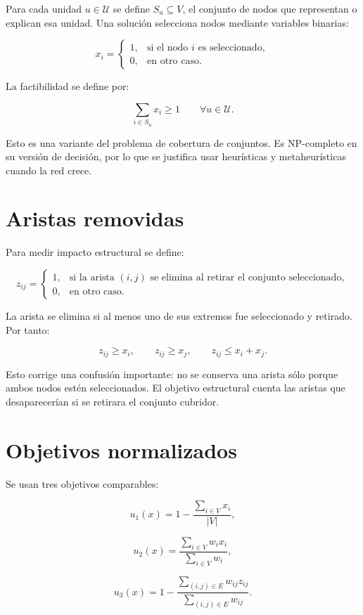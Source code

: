 \documentclass[11pt]{article}
\begin{document}
Para cada unidad $u\in \mathcal{U}$ se define $S_u\subseteq V$, el conjunto de nodos que representan o explican esa unidad. Una solución selecciona nodos mediante variables binarias:

\[
x_i =
\begin{cases}
1, & \text{si el nodo } i \text{ es seleccionado},\\
0, & \text{en otro caso}.
\end{cases}
\]

La factibilidad se define por:

\[
\sum_{i\in S_u} x_i \geq 1 \qquad \forall u\in \mathcal{U}.
\]

Esto es una variante del problema de cobertura de conjuntos. Es NP-completo en su versión de decisión, por lo que se justifica usar heurísticas y metaheurísticas cuando la red crece.

\section{Aristas removidas}

Para medir impacto estructural se define:

\[
z_{ij} =
\begin{cases}
1, & \text{si la arista } (i,j) \text{ se elimina al retirar el conjunto seleccionado},\\
0, & \text{en otro caso}.
\end{cases}
\]

La arista se elimina si al menos uno de sus extremos fue seleccionado y retirado. Por tanto:

\[
z_{ij} \geq x_i,\qquad z_{ij}\geq x_j,\qquad z_{ij}\leq x_i+x_j.
\]

Esto corrige una confusión importante: no se conserva una arista sólo porque ambos nodos estén seleccionados. El objetivo estructural cuenta las aristas que desaparecerían si se retirara el conjunto cubridor.

\section{Objetivos normalizados}

Se usan tres objetivos comparables:

\[
u_1(x)=1-\frac{\sum_{i\in V}x_i}{|V|},
\]

\[
u_2(x)=\frac{\sum_{i\in V} w_i x_i}{\sum_{i\in V} w_i},
\]

\[
u_3(x)=1-\frac{\sum_{(i,j)\in E}w_{ij}z_{ij}}{\sum_{(i,j)\in E}w_{ij}}.
\]
\end{document}
